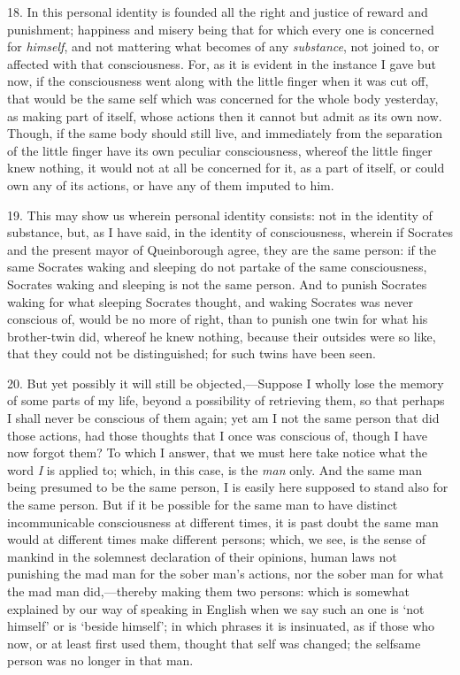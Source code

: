 18. In this personal identity is founded all the right and justice of
reward and punishment; happiness and misery being that for which every
one is concerned for \textit{himself}, and not mattering what becomes
of any \textit{substance}, not joined to, or affected with that
consciousness. For, as it is evident in the instance I gave but now,
if the consciousness went along with the little finger when it was cut
off, that would be the  same self which was concerned for
the whole body yesterday, as making part of itself, whose actions then
it cannot but admit as its own now. Though, if the same body should
still live, and immediately from the separation of the little finger
have its own peculiar consciousness, whereof the little finger knew
nothing, it would not at all be concerned for it, as a part of itself,
or could own any of its actions, or have any of them imputed to him.

19. This may show us wherein personal identity consists: not in the
identity of substance, but, as I have said, in the identity of
consciousness, wherein if Socrates and the present mayor of
Queinborough agree, they are the same person: if the same Socrates
waking and sleeping do not partake of the same consciousness, Socrates
waking and sleeping is not the same person. And to punish Socrates
waking for what sleeping Socrates thought, and waking Socrates was
never conscious of, would be no more of right, than to punish one twin
for what his brother-twin did, whereof he knew nothing, because their
outsides were so like, that they could not be distinguished; for such
twins have been seen.

20. But yet possibly it will still be objected,---Sup\-pose I wholly
lose the memory of some parts of my life, beyond a possibility of
retrieving them, so that perhaps I shall never be conscious of them
again; yet am I not the same person that did those actions, had those
thoughts that I once was conscious of, though I have now forgot them?
To which I answer, that we must here take notice what the word
\textit{I} is applied to; which, in this case, is the \textit{man}
only. And the same man being presumed to be the same person, I is
easily here supposed to stand also for the same person. But if it
 be possible for the same man to have distinct
incommunicable consciousness at different times, it is past doubt the
same man would at different times make different persons; which, we
see, is the sense of mankind in the solemnest declaration of their
opinions, human laws not punishing the mad man for the sober man's
actions, nor the sober man for what the mad man did,---there\-by
making them two persons: which is somewhat explained by our way of
speaking in English when we say such an one is `not himself' or is
`beside himself'; in which phrases it is insinuated, as if those who
now, or at least first used them, thought that self was changed; the
selfsame person was no longer in that man.

